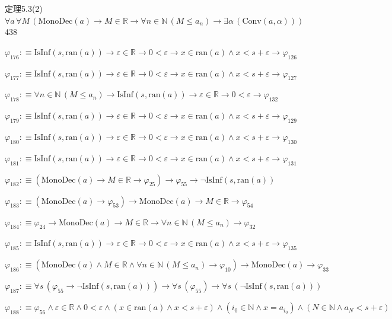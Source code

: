 \begin{fullproof}{定理5.3(2)}{$\forall a\,\forall M\,(\mathrm{MonoDec}(a) \to M \in \mathbb{R} \to \forall n \in \mathbb{N}\,(M \leq a_{n}) \to \exists \alpha\,(\mathrm{Conv}(a,\alpha)))$}{438}
\begin{abbrevlist}
\item $\varphi_{176} :\equiv \mathrm{IsInf}(s,\mathrm{ran}(a)) \to \varepsilon \in \mathbb{R} \to 0 < \varepsilon \to x \in \mathrm{ran}(a) \land x < s + \varepsilon \to \varphi_{126}$
\item $\varphi_{177} :\equiv \mathrm{IsInf}(s,\mathrm{ran}(a)) \to \varepsilon \in \mathbb{R} \to 0 < \varepsilon \to x \in \mathrm{ran}(a) \land x < s + \varepsilon \to \varphi_{127}$
\item $\varphi_{178} :\equiv \forall n \in \mathbb{N}\,(M \leq a_{n}) \to \mathrm{IsInf}(s,\mathrm{ran}(a)) \to \varepsilon \in \mathbb{R} \to 0 < \varepsilon \to \varphi_{132}$
\item $\varphi_{179} :\equiv \mathrm{IsInf}(s,\mathrm{ran}(a)) \to \varepsilon \in \mathbb{R} \to 0 < \varepsilon \to x \in \mathrm{ran}(a) \land x < s + \varepsilon \to \varphi_{129}$
\item $\varphi_{180} :\equiv \mathrm{IsInf}(s,\mathrm{ran}(a)) \to \varepsilon \in \mathbb{R} \to 0 < \varepsilon \to x \in \mathrm{ran}(a) \land x < s + \varepsilon \to \varphi_{130}$
\item $\varphi_{181} :\equiv \mathrm{IsInf}(s,\mathrm{ran}(a)) \to \varepsilon \in \mathbb{R} \to 0 < \varepsilon \to x \in \mathrm{ran}(a) \land x < s + \varepsilon \to \varphi_{131}$
\item $\varphi_{182} :\equiv (\mathrm{MonoDec}(a) \to M \in \mathbb{R} \to \varphi_{25}) \to \varphi_{55} \to \neg \mathrm{IsInf}(s,\mathrm{ran}(a))$
\item $\varphi_{183} :\equiv (\mathrm{MonoDec}(a) \to \varphi_{53}) \to \mathrm{MonoDec}(a) \to M \in \mathbb{R} \to \varphi_{54}$
\item $\varphi_{184} :\equiv \varphi_{24} \to \mathrm{MonoDec}(a) \to M \in \mathbb{R} \to \forall n \in \mathbb{N}\,(M \leq a_{n}) \to \varphi_{32}$
\item $\varphi_{185} :\equiv \mathrm{IsInf}(s,\mathrm{ran}(a)) \to \varepsilon \in \mathbb{R} \to 0 < \varepsilon \to x \in \mathrm{ran}(a) \land x < s + \varepsilon \to \varphi_{135}$
\item $\varphi_{186} :\equiv (\mathrm{MonoDec}(a) \land M \in \mathbb{R} \land \forall n \in \mathbb{N}\,(M \leq a_{n}) \to \varphi_{10}) \to \mathrm{MonoDec}(a) \to \varphi_{33}$
\item $\varphi_{187} :\equiv \forall s\,(\varphi_{55} \to \neg \mathrm{IsInf}(s,\mathrm{ran}(a))) \to \forall s\,(\varphi_{55}) \to \forall s\,(\neg \mathrm{IsInf}(s,\mathrm{ran}(a)))$
\item $\varphi_{188} :\equiv \varphi_{56} \land \varepsilon \in \mathbb{R} \land 0 < \varepsilon \land (x \in \mathrm{ran}(a) \land x < s + \varepsilon) \land (i_{0} \in \mathbb{N} \land x = a_{i_{0}}) \land (N \in \mathbb{N} \land a_{N} < s + \varepsilon)$

\end{abbrevlist}
\end{fullproof}
